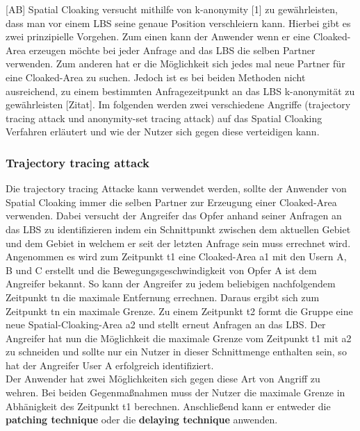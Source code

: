 [AB] Spatial Cloaking versucht mithilfe von k-anonymity [1] zu gewährleisten, dass man vor einem LBS seine genaue Position verschleiern kann. Hierbei gibt es zwei prinzipielle Vorgehen. Zum einen kann der Anwender wenn er eine Cloaked-Area erzeugen möchte bei jeder Anfrage and das LBS die selben Partner verwenden. Zum anderen hat er die Möglichkeit sich jedes mal neue Partner für eine Cloaked-Area zu suchen. Jedoch ist es bei beiden Methoden nicht ausreichend, zu einem bestimmten Anfragezeitpunkt an das LBS k-anonymität zu gewährleisten [Zitat]. Im folgenden werden zwei verschiedene Angriffe (trajectory tracing attack und anonymity-set tracing attack) auf das Spatial Cloaking Verfahren erläutert und wie der Nutzer sich gegen diese verteidigen kann. 
\subsubsection{Trajectory tracing attack}
Die trajectory tracing Attacke kann verwendet werden, sollte der Anwender von Spatial Cloaking immer die selben Partner zur Erzeugung einer Cloaked-Area verwenden. Dabei versucht der Angreifer das Opfer anhand seiner Anfragen an das LBS zu identifizieren indem ein Schnittpunkt zwischen dem aktuellen Gebiet und dem Gebiet in welchem er seit der letzten Anfrage sein muss errechnet wird. Angenommen es wird zum Zeitpunkt t1 eine Cloaked-Area a1 mit den Usern A, B und C erstellt und die Bewegungsgeschwindigkeit von Opfer A ist dem Angreifer bekannt. So kann der Angreifer zu jedem beliebigen nachfolgendem Zeitpunkt tn die maximale Entfernung errechnen. Daraus ergibt sich zum Zeitpunkt tn ein maximale Grenze. Zu einem Zeitpunkt t2 formt die Gruppe eine neue Spatial-Cloaking-Area a2 und stellt erneut Anfragen an das LBS. Der Angreifer hat nun die Möglichkeit die maximale Grenze vom Zeitpunkt t1 mit a2 zu schneiden und sollte nur ein Nutzer in dieser Schnittmenge enthalten sein, so hat der Angreifer User A erfolgreich identifiziert.\\ 
Der Anwender hat zwei Möglichkeiten sich gegen diese Art von Angriff zu wehren. Bei beiden Gegenmaßnahmen muss der Nutzer die maximale Grenze in Abhänigkeit des Zeitpunkt t1 berechnen. Anschließend kann er entweder die \textbf{patching technique} oder die \textbf{delaying technique} anwenden.
